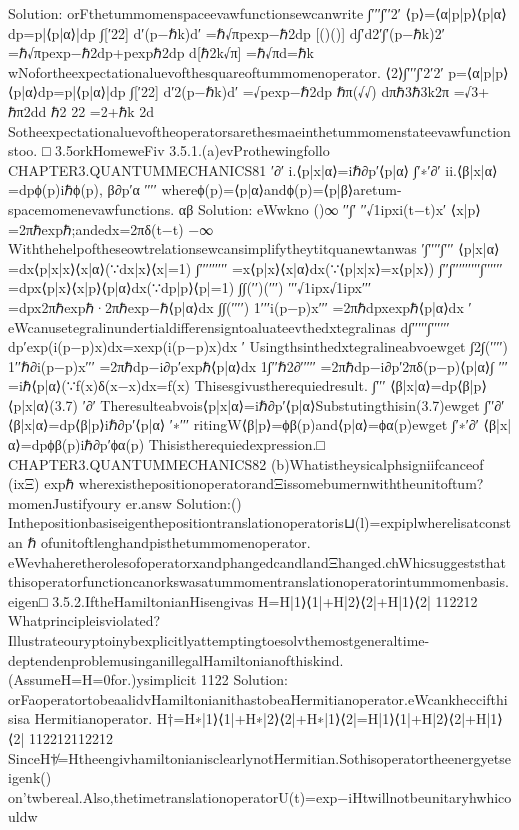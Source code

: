 {{Solution:
orFthetummomenspaceevawfunctionsewcanwrite
∫′′′∫′′2′
⟨p⟩=⟨α|p|p⟩⟨p|α⟩dp=p|⟨p|α⟩|dp
∫[′22]
d′(p−ℏk)d′
=ℏ√πpexp−ℏ2dp
[()()]
d∫′d2′∫′(p−ℏk)2′
=ℏ√πpexp−ℏ2dp+pexpℏ2dp
d[ℏ2k√π]
=ℏ√πd=ℏk
wNofortheexpectationaluevofthesquareoftummomenoperator.
⟨2⟩∫′′′∫′2′2′
p=⟨α|p|p⟩⟨p|α⟩dp=p|⟨p|α⟩|dp
∫[′22]
d′2(p−ℏk)d′
=√pexp−ℏ2dp
ℏπ(√√)
dπℏ3ℏ3k2π
=√3+
ℏπ2dd
ℏ2
22
=2+ℏk
2d
Sotheexpectationaluevoftheoperatorsarethesmaeinthetummomenstateevawfunctionstoo.
□
3.5orkHomeweFiv
3.5.1.(a)evProthewingfollo
CHAPTER3.QUANTUMMECHANICS81
′∂′
i.⟨p|x|α⟩=iℏ∂p′⟨p|α⟩
∫′∗′∂′
ii.⟨β|x|α⟩=dpϕ(p)iℏϕ(p),
β∂p′α
′′′′
whereϕ(p)=⟨p|α⟩andϕ(p)=⟨p|β⟩aretum-spacemomenevawfunctions.
αβ
Solution:
eWwkno
()∞
′′∫′
′′√1ipxi(t−t)x′
⟨x|p⟩=2πℏexpℏ;andedx=2πδ(t−t)
−∞
Withthehelpoftheseowtrelationsewcansimplifytheytitquanewtanwas
′∫′′′′∫′′′
⟨p|x|α⟩=dx⟨p|x|x⟩⟨x|α⟩(∵dx|x⟩⟨x|=1)
∫′′′′′′′′′
=x⟨p|x⟩⟨x|α⟩dx(∵⟨p|x|x⟩=x⟨p|x⟩)
∫′′∫′′′′′′′′′∫′′′′′′
=dpx⟨p|x⟩⟨x|p⟩⟨p|α⟩dx(∵dp|p⟩⟨p|=1)
∫∫(′′)(′′′)
′′′√1ipx√1ipx′′′
=dpx2πℏexpℏ·2πℏexp−ℏ⟨p|α⟩dx
∫∫(′′′′)
1′′′i(p−p)x′′′
=2πℏdpxexpℏ⟨p|α⟩dx
′
eWcanusetegralinundertialdifferensigntoaluateevthedxtegralinas
d∫′′′′′∫′′′′′′
dp′exp(i(p−p)x)dx=xexp(i(p−p)x)dx
′
Usingthsinthedxtegralineabvoewget
∫2∫(′′′′)
1′′ℏ∂i(p−p)x′′′
=2πℏdp−i∂p′expℏ⟨p|α⟩dx
1∫′′ℏ2∂′′′′′
=2πℏdp−i∂p′2πδ(p−p)⟨p|α⟩∫
′′′
=iℏ⟨p|α⟩(∵f(x)δ(x−x)dx=f(x)
Thisesgivustherequiedresult.
∫′′′
⟨β|x|α⟩=dp⟨β|p⟩⟨p|x|α⟩(3.7)
′∂′
Theresulteabvois⟨p|x|α⟩=iℏ∂p′⟨p|α⟩Substutingthisin(3.7)ewget
∫′′∂′
⟨β|x|α⟩=dp⟨β|p⟩iℏ∂p′⟨p|α⟩
′∗′′′
ritingW⟨β|p⟩=ϕβ(p)and⟨p|α⟩=ϕα(p)ewget
∫′∗′∂′
⟨β|x|α⟩=dpϕβ(p)iℏ∂p′ϕα(p)
Thisistherequiedexpression.□
CHAPTER3.QUANTUMMECHANICS82
(b)Whatistheysicalphsigniifcanceof
(ixΞ)
expℏ
wherexisthepositionoperatorandΞissomebumernwiththeunitoftum?momenJustifyoury
er.answ
Solution:()
Inthepositionbasiseigenthepositiontranslationoperatoris⊔(l)=expiplwherelisatconstan
ℏ
ofunitoftlenghandpisthetummomenoperator.
eWevhaheretherolesofoperatorxandphangedcandlandΞhanged.chWhicsuggeststhat
thisoperatorfunctioncanorkswasatummomentranslationoperatorintummomenbasis.eigen□
3.5.2.IftheHamiltonianHisengivas
H=H|1⟩⟨1|+H|2⟩⟨2|+H|1⟩⟨2|
112212
Whatprincipleisviolated?Illustrateouryptoinybexplicitlyattemptingtoesolvthemostgeneraltime-
deptendenproblemusinganillegalHamiltonianofthiskind.(AssumeH=H=0for.)ysimplicit
1122
Solution:
orFaoperatortobeaalidvHamiltonianithastobeaHermitianoperator.eWcankheccifthisisa
Hermitianoperator.
H†=H∗|1⟩⟨1|+H∗|2⟩⟨2|+H∗|1⟩⟨2|=H|1⟩⟨1|+H|2⟩⟨2|+H|1⟩⟨2|
112212112212
SinceH†̸=HtheengivhamiltonianisclearlynotHermitian.Sothisoperatortheenergyetseigenk()
on’twbereal.Also,thetimetranslationoperatorU(t)=exp−iHtwillnotbeunitaryhwhicouldw
}}
